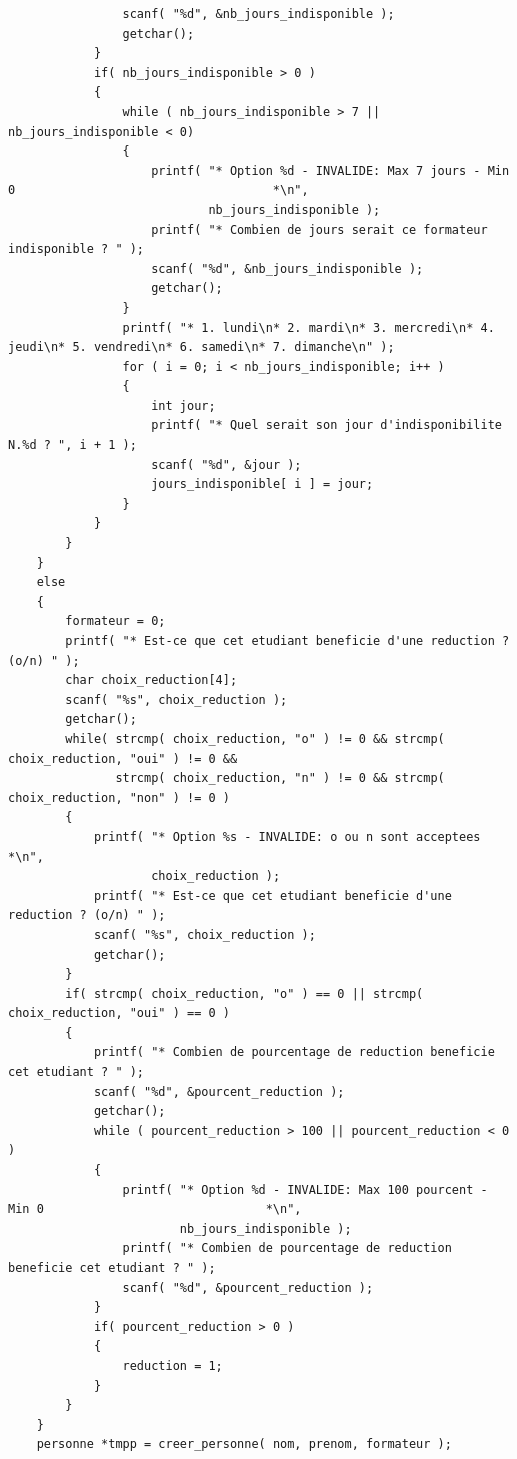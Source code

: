 \documentclass[11pt]{article}
\begin{document}
\begin{lstlisting}
                scanf( "%d", &nb_jours_indisponible );
                getchar();
            }
            if( nb_jours_indisponible > 0 )
            {
                while ( nb_jours_indisponible > 7 || nb_jours_indisponible < 0)
                {
                    printf( "* Option %d - INVALIDE: Max 7 jours - Min 0                                    *\n",
                            nb_jours_indisponible );
                    printf( "* Combien de jours serait ce formateur indisponible ? " );
                    scanf( "%d", &nb_jours_indisponible );
                    getchar();
                }
                printf( "* 1. lundi\n* 2. mardi\n* 3. mercredi\n* 4. jeudi\n* 5. vendredi\n* 6. samedi\n* 7. dimanche\n" );
                for ( i = 0; i < nb_jours_indisponible; i++ )
                {
                    int jour;
                    printf( "* Quel serait son jour d'indisponibilite N.%d ? ", i + 1 );
                    scanf( "%d", &jour );
                    jours_indisponible[ i ] = jour;
                }
            }
        }
    }
    else
    {
        formateur = 0;
        printf( "* Est-ce que cet etudiant beneficie d'une reduction ? (o/n) " );
        char choix_reduction[4];
        scanf( "%s", choix_reduction );
        getchar();
        while( strcmp( choix_reduction, "o" ) != 0 && strcmp( choix_reduction, "oui" ) != 0 &&
               strcmp( choix_reduction, "n" ) != 0 && strcmp( choix_reduction, "non" ) != 0 )
        {
            printf( "* Option %s - INVALIDE: o ou n sont acceptees                                  *\n",
                    choix_reduction );
            printf( "* Est-ce que cet etudiant beneficie d'une reduction ? (o/n) " );
            scanf( "%s", choix_reduction );
            getchar();
        }
        if( strcmp( choix_reduction, "o" ) == 0 || strcmp( choix_reduction, "oui" ) == 0 )
        {
            printf( "* Combien de pourcentage de reduction beneficie cet etudiant ? " );
            scanf( "%d", &pourcent_reduction );
            getchar();
            while ( pourcent_reduction > 100 || pourcent_reduction < 0 )
            {
                printf( "* Option %d - INVALIDE: Max 100 pourcent - Min 0                               *\n",
                        nb_jours_indisponible );
                printf( "* Combien de pourcentage de reduction beneficie cet etudiant ? " );
                scanf( "%d", &pourcent_reduction );
            }
            if( pourcent_reduction > 0 )
            {
                reduction = 1;
            }
        }
    }
    personne *tmpp = creer_personne( nom, prenom, formateur );

\end{lstlisting}
\end{document}
